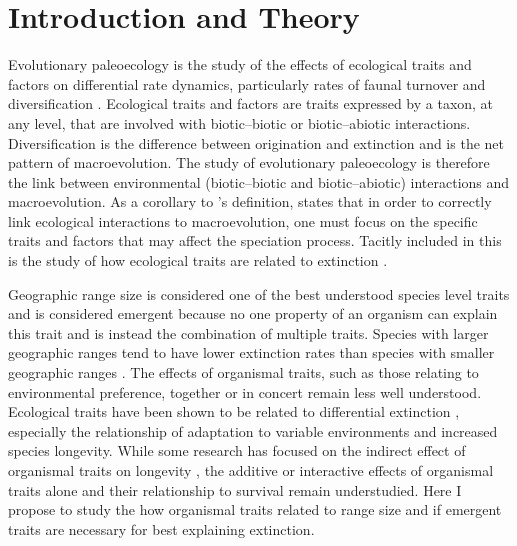 \documentclass[12pt,letterpaper]{article}
\begin{document}
\section{Introduction and Theory}
%
Evolutionary paleoecology is the study of the effects of ecological traits and factors on differential rate dynamics, particularly rates of faunal turnover and diversification \citep{Kitchell1985a}. Ecological traits and factors are traits expressed by a taxon, at any level, that are involved with biotic--biotic or biotic--abiotic interactions. Diversification is the difference between origination and extinction and is the net pattern of macroevolution. The study of evolutionary paleoecology is therefore the link between environmental (biotic--biotic and biotic--abiotic) interactions and macroevolution. As a corollary to \citet{Kitchell1985a}'s definition, \citet{Allmon1994} states that in order to correctly link ecological interactions to macroevolution, one must focus on the specific traits and factors that may affect the speciation process. Tacitly included in this is the study of how ecological traits are related to extinction \citep{Kitchell1990}.

Geographic range size is considered one of the best understood species level traits \citep{Jablonski2008a} and is considered emergent because no one property of an organism can explain this trait and is instead the combination of multiple traits. Species with larger geographic ranges tend to have lower extinction rates than species with smaller geographic ranges \citep{Jablonski1986,Harnik2013,Nurnberg2013a,Jablonski2003,Roy2009c}. The effects of organismal traits, such as those relating to environmental preference, together or in concert remain less well understood. Ecological traits have been shown to be related to differential extinction \citep{Foote2013,Liow2007b,Baumiller1993,Nurnberg2013a}, especially the relationship of adaptation to variable environments and increased species longevity. While some research has focused on the indirect effect of organismal traits on longevity \citep{Harnik2011}, the additive or interactive effects of organismal traits alone and their relationship to survival remain understudied. Here I propose to study the how organismal traits related to range size and if emergent traits are necessary for best explaining extinction.
\end{document}
